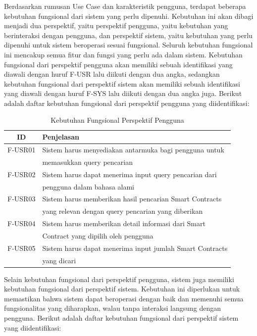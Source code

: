Berdasarkan rumusan Use Case dan karakteristik pengguna, terdapat beberapa kebutuhan fungsional dari sistem yang perlu dipenuhi. Kebutuhan ini akan dibagi menjadi dua perspektif, yaitu perspektif pengguna, yaitu kebutuhan yang berinteraksi dengan pengguna, dan perspektif sistem, yaitu kebutuhan yang perlu dipenuhi untuk sistem beroperasi sesuai fungsional. Seluruh kebutuhan fungsional ini mencakup semua fitur dan fungsi yang perlu ada dalam sistem. Kebutuhan fungsional dari perspektif pengguna akan memiliki sebuah identifikasi yang diawali dengan huruf F-USR lalu diikuti dengan dua angka, sedangkan kebutuhan fungsional dari perspektif sistem akan memiliki sebuah identifikasi yang diawali dengan huruf F-SYS lalu diikuti dengan dua angka juga. Berikut adalah daftar kebutuhan fungsional dari perspektif pengguna yang diidentifikasi:

\begin{table}[ht]
	\caption{Kebutuhan Fungsional Perspektif Pengguna}
	\vspace{0.25cm}
	\begin{center}
		\begin{tabular}{|c|l|}
			\hline
			\textbf{ID} & \textbf{Penjelasan}                                      \\ \hline
			F-USR01     & Sistem harus menyediakan antarmuka bagi pengguna untuk   \\ & memasukkan query pencarian \\ \hline
			F-USR02     & Sistem harus dapat menerima input query pencarian dari   \\ & pengguna dalam bahasa alami \\ \hline
			F-USR03     & Sistem harus memberikan hasil pencarian Smart Contracts  \\ & yang relevan dengan query pencarian yang diberikan \\ \hline
			F-USR04     & Sistem harus memberikan detail informasi dari Smart      \\ & Contract yang dipilih oleh pengguna \\ \hline
			F-USR05     & Sistem harus dapat menerima input jumlah Smart Contracts \\ & yang dicari \\ \hline
		\end{tabular}
	\end{center}
\end{table}

\break

Selain kebutuhan fungsional dari perspektif pengguna, sistem juga memiliki kebutuhan fungsional dari perspektif sistem. Kebutuhan ini diperlukan untuk memastikan bahwa sistem dapat beroperasi dengan baik dan memenuhi semua fungsionalitas yang diharapkan, walau tanpa interaksi langsung dengan pengguna. Berikut adalah daftar kebutuhan fungsional dari perspektif sistem yang diidentifikasi:

